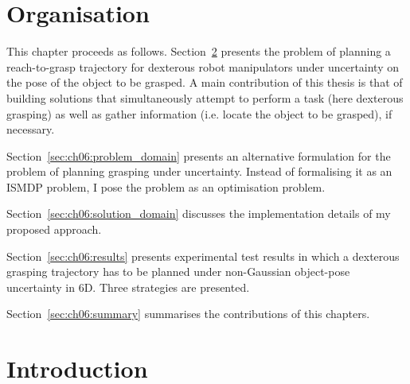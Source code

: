 \section{Organisation}

This chapter proceeds as follows. Section~\ref{sec:ch06:introduction} presents the problem of planning a reach-to-grasp trajectory for dexterous robot manipulators under uncertainty on the pose of the object to be grasped. A main contribution of this thesis is that of building solutions that simultaneously attempt to perform a task (here dexterous grasping) as well as gather information (i.e. locate the object to be grasped), if necessary.

Section~\ref{sec:ch06:problem_domain} presents an alternative formulation for the problem of planning grasping under uncertainty. Instead of formalising it as an ISMDP problem, I pose the problem as an optimisation problem. 

Section~\ref{sec:ch06:solution_domain} discusses the implementation details of my proposed approach.

Section~\ref{sec:ch06:results} presents experimental test results in which a dexterous grasping trajectory has to be planned under non-Gaussian object-pose uncertainty in 6D. Three strategies are presented. 

Section~\ref{sec:ch06:summary} summarises the contributions of this chapters. 


\section{Introduction}\label{sec:ch06:introduction}

